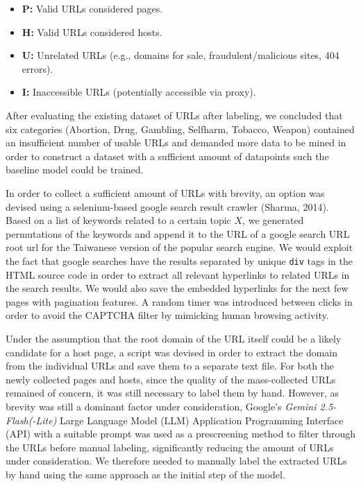 \documentclass[
  titlepage]{article}
\providecommand{\tightlist}{%
  \setlength{\itemsep}{0pt}\setlength{\parskip}{0pt}}
\begin{document}
\begin{itemize}
\tightlist
\item
  \textbf{P:} Valid URLs considered pages.
\item
  \textbf{H:} Valid URLs considered hosts.
\item
  \textbf{U:} Unrelated URLs (e.g., domains for sale,
  fraudulent/malicious sites, 404 errors).
\item
  \textbf{I:} Inaccessible URLs (potentially accessible via proxy).
\end{itemize}

After evaluating the existing dataset of URLs after labeling, we
concluded that six categories (Abortion, Drug, Gambling, Selfharm,
Tobacco, Weapon) contained an insufficient number of usable URLs and
demanded more data to be mined in order to construct a dataset with a
sufficient amount of datapoints such the baseline model could be
trained.

In order to collect a sufficient amount of URLs with brevity, an option
was devised using a selenium-based google search result crawler (Sharma,
2014). Based on a list of keywords related to a certain topic \(X\), we
generated permutations of the keywords and append it to the URL of a
google search URL root url for the Taiwanese version of the popular
search engine. We would exploit the fact that google searches have the
results separated by unique \texttt{div} tags in the HTML source code in
order to extract all relevant hyperlinks to related URLs in the search
results. We would also save the embedded hyperlinks for the next few
pages with pagination features. A random timer was introduced between
clicks in order to avoid the CAPTCHA filter by mimicking human browsing
activity.

Under the assumption that the root domain of the URL itself could be a
likely candidate for a host page, a script was devised in order to
extract the domain from the individual URLs and save them to a separate
text file. For both the newly collected pages and hosts, since the
quality of the mass-collected URLs remained of concern, it was still
necessary to label them by hand. However, as brevity was still a
dominant factor under consideration, Google's \emph{Gemini
2.5-Flash(-Lite)} Large Language Model (LLM) Application Programming
Interface (API) with a suitable prompt was used as a prescreening method
to filter through the URLs before manual labeling, significantly
reducing the amount of URLs under consideration. We therefore needed to
manually label the extracted URLs by hand using the same approach as the
initial step of the model.
\end{document}
